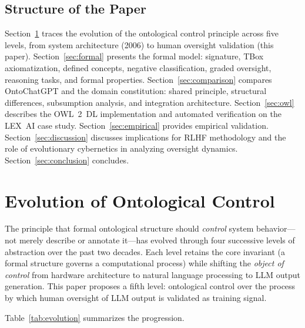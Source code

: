 \documentclass[11pt]{article}
\begin{document}
\subsection{Structure of the Paper}
\label{sec:structure}

Section~\ref{sec:evolution} traces the evolution of the ontological control principle across five levels, from system architecture (2006) to human oversight validation (this paper).
Section~\ref{sec:formal} presents the formal model: signature, TBox axiomatization, defined concepts, negative classification, graded oversight, reasoning tasks, and formal properties.
Section~\ref{sec:comparison} compares OntoChatGPT and the domain constitution: shared principle, structural differences, subsumption analysis, and integration architecture.
Section~\ref{sec:owl} describes the OWL~2~DL implementation and automated verification on the LEX~AI case study.
Section~\ref{sec:empirical} provides empirical validation.
Section~\ref{sec:discussion} discusses implications for RLHF methodology and the role of evolutionary cybernetics in analyzing oversight dynamics.
Section~\ref{sec:conclusion} concludes.


\section{Evolution of Ontological Control}
\label{sec:evolution}

The principle that formal ontological structure should \emph{control} system behavior---not merely describe or annotate it---has evolved through four successive levels of abstraction over the past two decades.
Each level retains the core invariant (a formal structure governs a computational process) while shifting the \emph{object of control} from hardware architecture to natural language processing to LLM output generation.
This paper proposes a fifth level: ontological control over the process by which human oversight of LLM output is validated as training signal.

Table~\ref{tab:evolution} summarizes the progression.
\end{document}

